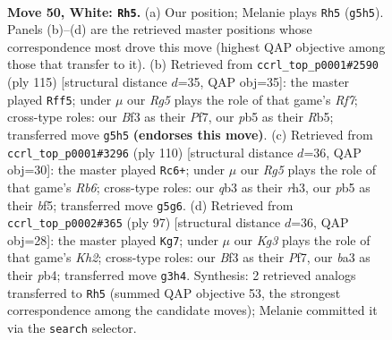 \documentclass[11pt]{article}
\begin{document}
\clearpage

\begin{figure}[p]\centering
\begin{subfigure}{0.46\textwidth}\centering
\resizebox{\linewidth}{!}{%
\newchessgame
\chessboard[
  setfen={8/p7/5k2/1p3PR1/8/bq3BK1/8/8 w - - 2 50},
  showmover=false,
  pgfstyle=straightmove, color=movearrow, markmove={g5-h5}
]}
\caption{}
\end{subfigure}\hfill
\begin{subfigure}{0.46\textwidth}\centering
\resizebox{\linewidth}{!}{%
\newchessgame
\chessboard[
  setfen={8/3k1pQ1/4p3/1r6/7P/6P1/5r2/6K1 b - - 2 58},
  showmover=false,
  pgfstyle=straightmove, color=movearrow, markmove={f2-f5}
]}
\caption{}
\end{subfigure}
\\[4pt]
\begin{subfigure}{0.46\textwidth}\centering
\resizebox{\linewidth}{!}{%
\newchessgame
\chessboard[
  setfen={8/8/1R6/2k2bp1/8/1P2KB1r/8/8 w - - 4 56},
  showmover=false,
  pgfstyle=straightmove, color=movearrow, markmove={b6-c6}
]}
\caption{}
\end{subfigure}\hfill
\begin{subfigure}{0.46\textwidth}\centering
\resizebox{\linewidth}{!}{%
\newchessgame
\chessboard[
  setfen={8/2Q2p1k/8/8/1P5p/8/2P1KP2/3r3r b - - 1 49},
  showmover=false,
  pgfstyle=straightmove, color=movearrow, markmove={h7-g7}
]}
\caption{}
\end{subfigure}
\caption{\textbf{Move 50, White: \texttt{Rh5}.} (a) Our position; Melanie plays \texttt{Rh5} (\texttt{g5h5}). Panels (b)--(d) are the retrieved master positions whose correspondence most drove this move (highest QAP objective among those that transfer to it). (b) Retrieved from \texttt{ccrl\_top\_p0001\#2590} (ply 115) [structural distance $d$=35, QAP obj=35]: the master played \texttt{Rff5}; under $\mu$ our \emph{Rg5} plays the role of that game's \emph{Rf7}; cross-type roles: our \emph{B}f3 as their \emph{P}f7, our \emph{p}b5 as their \emph{R}b5; transferred move \texttt{g5h5} \textbf{(endorses this move)}. (c) Retrieved from \texttt{ccrl\_top\_p0001\#3296} (ply 110) [structural distance $d$=36, QAP obj=30]: the master played \texttt{Rc6+}; under $\mu$ our \emph{Rg5} plays the role of that game's \emph{Rb6}; cross-type roles: our \emph{q}b3 as their \emph{r}h3, our \emph{p}b5 as their \emph{b}f5; transferred move \texttt{g5g6}. (d) Retrieved from \texttt{ccrl\_top\_p0002\#365} (ply 97) [structural distance $d$=36, QAP obj=28]: the master played \texttt{Kg7}; under $\mu$ our \emph{Kg3} plays the role of that game's \emph{Kh2}; cross-type roles: our \emph{B}f3 as their \emph{P}f7, our \emph{b}a3 as their \emph{p}b4; transferred move \texttt{g3h4}. Synthesis: 2 retrieved analogs transferred to \texttt{Rh5} (summed QAP objective 53, the strongest correspondence among the candidate moves); Melanie committed it via the \texttt{search} selector.}
\label{fig:thought-m98}
\end{figure}
\end{document}
